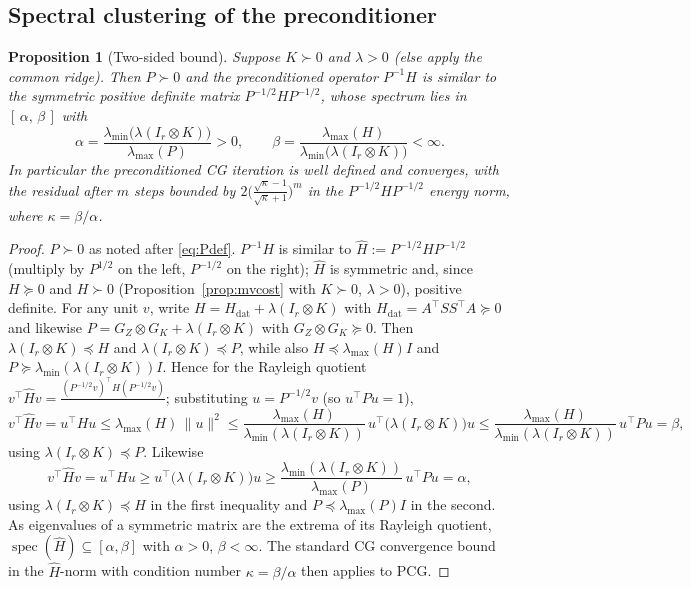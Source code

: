 \documentclass[12pt]{article}
\newtheorem{proposition}{Proposition}
\theoremstyle{definition}
\begin{document}
\subsection{Spectral clustering of the preconditioner}

\begin{proposition}[Two-sided bound]\label{prop:precond}
Suppose $K\succ0$ and $\lambda>0$ (else apply the common ridge). Then
$P\succ0$ and the preconditioned operator $P^{-1}H$ is similar to the symmetric
positive definite matrix $P^{-1/2}HP^{-1/2}$, whose spectrum lies in
$[\,\alpha,\,\beta\,]$ with
\begin{equation}\label{eq:specbound}
\alpha=\frac{\lambda_{\min}\big(\lambda(I_r\otimes K)\big)}
{\lambda_{\max}(P)}>0,
\qquad
\beta=\frac{\lambda_{\max}(H)}{\lambda_{\min}\big(\lambda(I_r\otimes K)\big)}<\infty.
\end{equation}
In particular the preconditioned CG iteration is well defined and converges, with
the residual after $m$ steps bounded by
$2\big(\tfrac{\sqrt{\kappa}-1}{\sqrt{\kappa}+1}\big)^m$ in the $P^{-1/2}HP^{-1/2}$
energy norm, where $\kappa=\beta/\alpha$.
\end{proposition}

\begin{proof}
$P\succ0$ as noted after \eqref{eq:Pdef}. $P^{-1}H$ is similar to
$\widehat H:=P^{-1/2}HP^{-1/2}$ (multiply by $P^{1/2}$ on the left,
$P^{-1/2}$ on the right); $\widehat H$ is symmetric and, since $H\succeq0$ and
$H\succ0$ (Proposition~\ref{prop:mvcost} with $K\succ0$, $\lambda>0$), positive
definite. For any unit $v$, write $H=H_{\mathrm{dat}}+\lambda(I_r\otimes K)$ with
$H_{\mathrm{dat}}=A^\top SS^\top A\succeq0$ and likewise
$P=G_Z\otimes G_K+\lambda(I_r\otimes K)$ with $G_Z\otimes G_K\succeq0$. Then
$\lambda(I_r\otimes K)\preceq H$ and $\lambda(I_r\otimes K)\preceq P$, while also
$H\preceq\lambda_{\max}(H)I$ and $P\succeq\lambda_{\min}(\lambda(I_r\otimes K))I$.
Hence for the Rayleigh quotient $v^\top\widehat Hv=
\frac{(P^{-1/2}v)^\top H(P^{-1/2}v)}{\ } $; substituting $u=P^{-1/2}v$ (so
$u^\top P u=1$),
\[
v^\top\widehat Hv=u^\top Hu
\le\lambda_{\max}(H)\,\|u\|^2
\le\frac{\lambda_{\max}(H)}{\lambda_{\min}(\lambda(I_r\otimes K))}\,u^\top
\big(\lambda(I_r\otimes K)\big)u
\le\frac{\lambda_{\max}(H)}{\lambda_{\min}(\lambda(I_r\otimes K))}\,u^\top Pu=\beta,
\]
using $\lambda(I_r\otimes K)\preceq P$. Likewise
\[
v^\top\widehat Hv=u^\top Hu\ge u^\top\big(\lambda(I_r\otimes K)\big)u
\ge\frac{\lambda_{\min}(\lambda(I_r\otimes K))}{\lambda_{\max}(P)}\,u^\top Pu=\alpha,
\]
using $\lambda(I_r\otimes K)\preceq H$ in the first inequality and
$P\preceq\lambda_{\max}(P)I$ in the second. As eigenvalues of a symmetric matrix
are the extrema of its Rayleigh quotient, $\operatorname{spec}(\widehat H)\subseteq
[\alpha,\beta]$ with $\alpha>0$, $\beta<\infty$. The standard CG convergence bound
in the $\widehat H$-norm with condition number $\kappa=\beta/\alpha$ then applies
to PCG.
\end{proof}
\end{document}
